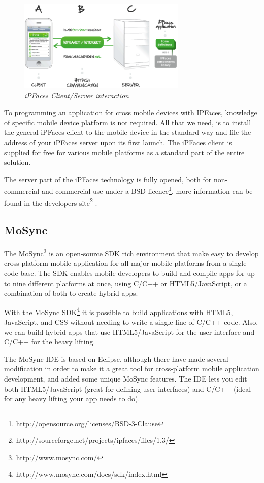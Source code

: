 \documentclass[a4paper,12pt]{book}
\begin{document}
\begin{figure}[H]
    \centering
    \includegraphics[width=8cm, keepaspectratio]{img/ipfaces.png}
    \caption{\textit{iPFaces Client/Server interaction}}
 \end{figure}

To programming an application for  cross mobile devices with IPFaces, knowledge of specific mobile device platform is not required.  All that we need,  is to install the general iPFaces client to the mobile device in the standard way and file the address of your iPFaces server upon its first launch. The iPFaces client is supplied for free for various mobile platforms as a standard part of the entire solution.

The server part of the iPFaces technology is fully opened, both for non-commercial and commercial use under a BSD licence\footnote{http://opensource.org/licenses/BSD-3-Clause}, more information can be found in the developers site\footnote{http://sourceforge.net/projects/ipfaces/files/1.3/} .

\subsection{MoSync}
\label{MoSync} 

The MoSync\footnote{http://www.mosync.com/}  is an open-source SDK rich environment that make easy to develop cross-platform mobile application for all major mobile platforms from a single code base. The SDK enables mobile developers to build and compile apps for up to nine different platforms at once, using C/C++ or HTML5/JavaScript, or a combination of both to create hybrid apps.

With the MoSync SDK\footnote{http://www.mosync.com/docs/sdk/index.html}  it is possible to build applications with HTML5, JavaScript, and CSS without needing to write a single line of C/C++ code. Also, we can build hybrid apps that use HTML5/JavaScript for the user interface and C/C++ for the heavy lifting. 

The MoSync IDE is based on Eclipse, although there have made several modification in order to make it a great tool for cross-platform mobile application development,  and added  some unique MoSync features. The IDE lets you edit both HTML5/JavaScript (great for defining user interfaces) and C/C++ (ideal for any heavy lifting your app needs to do).
\end{document}
